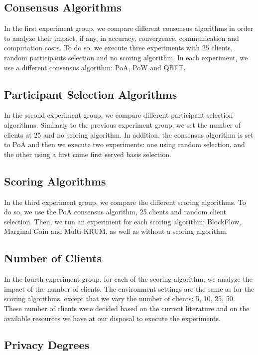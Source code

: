 \subsection{Consensus Algorithms}

In the first experiment group, we compare different consensus algorithms in order to analyze their impact, if any, in accuracy, convergence, communication and computation costs. To do so, we execute three experiments with 25 clients, random participants selection and no scoring algorithm. In each experiment, we use a different consensus algorithm: PoA, PoW and QBFT.

\subsection{Participant Selection Algorithms}

In the second experiment group, we compare different participant selection algorithms. Similarly to the previous experiment group, we set the number of clients at 25 and no scoring algorithm. In addition, the consensus algorithm is set to PoA and then we execute two experiments: one using random selection, and the other using a first come first served basis selection.

\subsection{Scoring Algorithms}

In the third experiment group, we compare the different scoring algorithms. To do so, we use the PoA consensus algorithm, 25 clients and random client selection. Then, we run an experiment for each scoring algorithm: BlockFlow, Marginal Gain and Multi-KRUM, as well as without a scoring algorithm.

\subsection{Number of Clients}

In the fourth experiment group, for each of the scoring algorithm, we analyze the impact of the number of clients. The environment settings are the same as for the scoring algorithms, except that we vary the number of clients: 5, 10, 25, 50. These number of clients were decided based on the current literature and on the available resources we have at our disposal to execute the experiments.

\subsection{Privacy Degrees}

